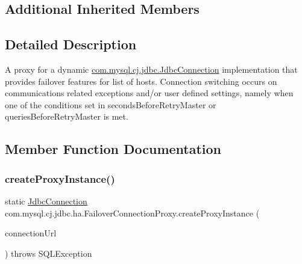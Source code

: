 \subsection*{Additional Inherited Members}


\subsection{Detailed Description}
A proxy for a dynamic \mbox{\hyperlink{interfacecom_1_1mysql_1_1cj_1_1jdbc_1_1_jdbc_connection}{com.\+mysql.\+cj.\+jdbc.\+Jdbc\+Connection}} implementation that provides failover features for list of hosts. Connection switching occurs on communications related exceptions and/or user defined settings, namely when one of the conditions set in \textquotesingle{}seconds\+Before\+Retry\+Master\textquotesingle{} or \textquotesingle{}queries\+Before\+Retry\+Master\textquotesingle{} is met. 

\subsection{Member Function Documentation}
\mbox{\label{classcom_1_1mysql_1_1cj_1_1jdbc_1_1ha_1_1_failover_connection_proxy_ae28f0509d52d59d9da141399ea8d3fc4}} 
\subsubsection{\texorpdfstring{create\+Proxy\+Instance()}{createProxyInstance()}}
{\footnotesize\ttfamily static \mbox{\hyperlink{interfacecom_1_1mysql_1_1cj_1_1jdbc_1_1_jdbc_connection}{Jdbc\+Connection}} com.\+mysql.\+cj.\+jdbc.\+ha.\+Failover\+Connection\+Proxy.\+create\+Proxy\+Instance (\begin{DoxyParamCaption}\item[{\mbox{\hyperlink{classcom_1_1mysql_1_1cj_1_1conf_1_1_connection_url}{Connection\+Url}}}]{connection\+Url }\end{DoxyParamCaption}) throws S\+Q\+L\+Exception\hspace{0.3cm}{\ttfamily [static]}}

